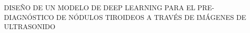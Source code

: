 \begin{center}
	\vspace*{10cm}
	{DISEÑO DE UN MODELO DE DEEP LEARNING PARA EL PRE-DIAGNÓSTICO DE NÓDULOS TIROIDEOS A TRAVÉS DE IMÁGENES DE ULTRASONIDO}
\end{center}
